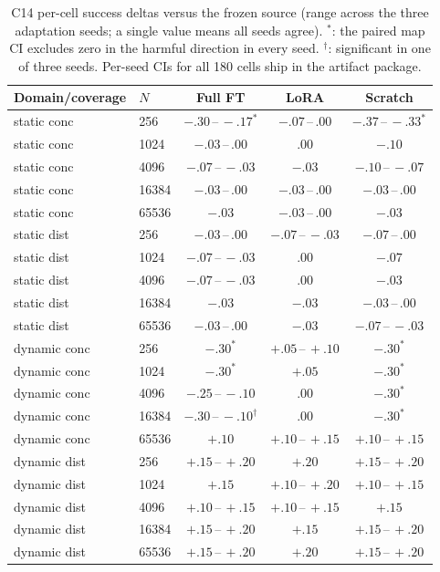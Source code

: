 \documentclass[letterpaper]{article} %
\newcommand{\stage}[1]{\textsc{#1}}
\begin{document}
\begin{table}[t]
\centering
\small
\setlength{\tabcolsep}{2.6pt}
\begin{tabular}{@{}llccc@{}}
\toprule
Domain/coverage & $N$ & Full FT & LoRA & Scratch \\
\midrule
static conc & 256 & $-.30\,$--$\,-.17^{*}$ & $-.07\,$--$\,.00$ & $-.37\,$--$\,-.33^{*}$ \\
static conc & 1024 & $-.03\,$--$\,.00$ & $.00$ & $-.10$ \\
static conc & 4096 & $-.07\,$--$\,-.03$ & $-.03$ & $-.10\,$--$\,-.07$ \\
static conc & 16384 & $-.03\,$--$\,.00$ & $-.03\,$--$\,.00$ & $-.03\,$--$\,.00$ \\
static conc & 65536 & $-.03$ & $-.03\,$--$\,.00$ & $-.03$ \\
static dist & 256 & $-.03\,$--$\,.00$ & $-.07\,$--$\,-.03$ & $-.07\,$--$\,.00$ \\
static dist & 1024 & $-.07\,$--$\,-.03$ & $.00$ & $-.07$ \\
static dist & 4096 & $-.07\,$--$\,-.03$ & $.00$ & $-.03$ \\
static dist & 16384 & $-.03$ & $-.03$ & $-.03\,$--$\,.00$ \\
static dist & 65536 & $-.03\,$--$\,.00$ & $-.03$ & $-.07\,$--$\,-.03$ \\
dynamic conc & 256 & $-.30^{*}$ & $+.05\,$--$\,+.10$ & $-.30^{*}$ \\
dynamic conc & 1024 & $-.30^{*}$ & $+.05$ & $-.30^{*}$ \\
dynamic conc & 4096 & $-.25\,$--$\,-.10$ & $.00$ & $-.30^{*}$ \\
dynamic conc & 16384 & $-.30\,$--$\,-.10^{\dagger}$ & $.00$ & $-.30^{*}$ \\
dynamic conc & 65536 & $+.10$ & $+.10\,$--$\,+.15$ & $+.10\,$--$\,+.15$ \\
dynamic dist & 256 & $+.15\,$--$\,+.20$ & $+.20$ & $+.15\,$--$\,+.20$ \\
dynamic dist & 1024 & $+.15$ & $+.10\,$--$\,+.20$ & $+.10\,$--$\,+.15$ \\
dynamic dist & 4096 & $+.10\,$--$\,+.15$ & $+.10\,$--$\,+.15$ & $+.15$ \\
dynamic dist & 16384 & $+.15\,$--$\,+.20$ & $+.15$ & $+.15\,$--$\,+.20$ \\
dynamic dist & 65536 & $+.15\,$--$\,+.20$ & $+.20$ & $+.15\,$--$\,+.20$ \\
\bottomrule
\end{tabular}
\caption{\stage{C14} per-cell success deltas versus the frozen source (range across the three adaptation seeds; a single value means all seeds agree). $^{*}$: the paired map CI excludes zero in the harmful direction in every seed. $^{\dagger}$: significant in one of three seeds. Per-seed CIs for all 180 cells ship in the artifact package.}
\label{tab:c14cells}
\end{table}
\end{document}
